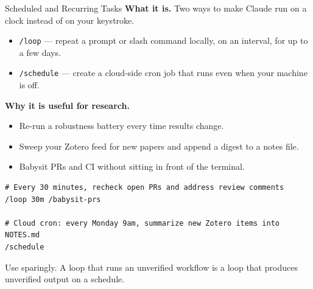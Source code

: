 \documentclass[aspectratio=169, 11pt]{beamer}
\begin{document}
\begin{frame}[fragile]{Scheduled and Recurring Tasks}
  \textbf{What it is.} Two ways to make Claude run on a clock instead of on your keystroke.
  \begin{itemize}\small
    \item \texttt{/loop} --- repeat a prompt or slash command locally, on an interval, for up to a few days.
    \item \texttt{/schedule} --- create a cloud-side cron job that runs even when your machine is off.
  \end{itemize}

  \vspace{0.4em}
  \textbf{Why it is useful for research.}
  \begin{itemize}\small
    \item Re-run a robustness battery every time results change.
    \item Sweep your Zotero feed for new papers and append a digest to a notes file.
    \item Babysit PRs and CI without sitting in front of the terminal.
  \end{itemize}

  \vspace{0.3em}
  \begin{lstlisting}[basicstyle=\ttfamily\footnotesize]
# Every 30 minutes, recheck open PRs and address review comments
/loop 30m /babysit-prs

# Cloud cron: every Monday 9am, summarize new Zotero items into NOTES.md
/schedule
  \end{lstlisting}

  \vspace{0.2em}
  {\small Use sparingly. A loop that runs an unverified workflow is a loop that produces unverified output on a schedule.}
\end{frame}
\end{document}
